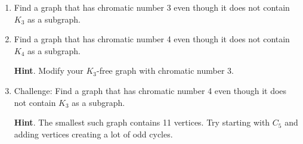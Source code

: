 \documentclass{book}
\begin{document}
\setcounter{cpjt}{43}
\addtocounter{cpjt}{-1}
\begin{activity}\label{activity-36}
\leavevmode%
\begin{enumerate}[font=\bfseries,label=(\alph*),ref=\alph*]
\item\label{task-55} \hypertarget{p-377}{}%
Find a graph that has chromatic number 3 even though it does not contain \(K_3\) as a subgraph.%
\item\label{task-56} \hypertarget{p-378}{}%
Find a graph that has chromatic number 4 even though it does not contain \(K_4\) as a subgraph.%
\par\smallskip%
\noindent\textbf{Hint}.\hypertarget{hint-16}{}\quad%
\hypertarget{p-379}{}%
Modify your \(K_3\)-free graph with chromatic number 3.%
\item\label{task-57} \hypertarget{p-380}{}%
Challenge: Find a graph that has chromatic number 4 even though it does not contain \(K_3\) as a subgraph.%
\par\smallskip%
\noindent\textbf{Hint}.\hypertarget{hint-17}{}\quad%
\hypertarget{p-381}{}%
The smallest such graph contains 11 vertices.  Try starting with \(C_5\) and adding vertices creating a lot of odd cycles.%
\end{enumerate}
\end{activity}

\clearpage
\end{document}
